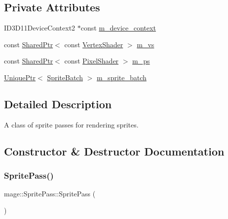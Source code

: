 \subsection*{Private Attributes}
\begin{DoxyCompactItemize}
\item 
I\+D3\+D11\+Device\+Context2 $\ast$const \hyperlink{classmage_1_1_sprite_pass_a483bd82ef7dbeaa384c5c763f5b03949}{m\+\_\+device\+\_\+context}
\item 
const \hyperlink{namespacemage_a1e01ae66713838a7a67d30e44c67703e}{Shared\+Ptr}$<$ const \hyperlink{classmage_1_1_vertex_shader}{Vertex\+Shader} $>$ \hyperlink{classmage_1_1_sprite_pass_ac6e86ad76e04aa3d2e266e9491d17f81}{m\+\_\+vs}
\item 
const \hyperlink{namespacemage_a1e01ae66713838a7a67d30e44c67703e}{Shared\+Ptr}$<$ const \hyperlink{namespacemage_a27ecaf266420ee7a494d64edc0757129}{Pixel\+Shader} $>$ \hyperlink{classmage_1_1_sprite_pass_a03965c38e565dbf0cbabdb35bc836124}{m\+\_\+ps}
\item 
\hyperlink{namespacemage_a3316d7143a973e37adf1110f2e80ca31}{Unique\+Ptr}$<$ \hyperlink{classmage_1_1_sprite_batch}{Sprite\+Batch} $>$ \hyperlink{classmage_1_1_sprite_pass_a9083152ae0681429df4dd0fce533f7dc}{m\+\_\+sprite\+\_\+batch}
\end{DoxyCompactItemize}


\subsection{Detailed Description}
A class of sprite passes for rendering sprites. 

\subsection{Constructor \& Destructor Documentation}
\hypertarget{classmage_1_1_sprite_pass_abe484eb7c99dabc585d874029c85013f}{}\label{classmage_1_1_sprite_pass_abe484eb7c99dabc585d874029c85013f} 
\subsubsection{\texorpdfstring{Sprite\+Pass()}{SpritePass()}\hspace{0.1cm}{\footnotesize\ttfamily [1/3]}}
{\footnotesize\ttfamily mage\+::\+Sprite\+Pass\+::\+Sprite\+Pass (\begin{DoxyParamCaption}{ }\end{DoxyParamCaption})}


